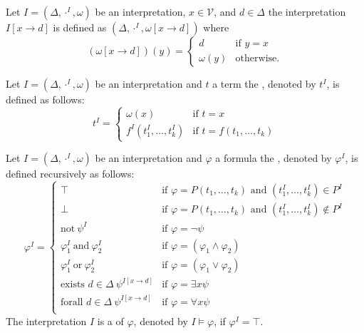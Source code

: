 Let $I=(\Delta,\cdot^I,\omega)$ be an interpretation, $x\in\mathcal{V}$, and $d\in\Delta$ the interpretation $I\left[x\to d\right]$ is defined as $(\Delta,\cdot^I,\omega\left[x\to d\right])$ where
\[(\omega\left[x\to d\right])(y)=
	\begin{cases}
		d         & \text{if $y=x$}   \\
		\omega(y) & \text{otherwise.} 
	\end{cases}\]
\begin{definition}
	Let $I=(\Delta,\cdot^I,\omega)$ be an interpretation and $t$ a term the , denoted by $t^I$, is defined as follows:
	\[t^I=
		\begin{cases}
			\omega(x)              & \text{if $t=x$}                \\
			f^I(t^I_1,\dots,t^I_k) & \text{if $t=f(t_1,\dots,t_k)$} 
		\end{cases}\]
\end{definition}
\begin{definition}
	Let $I=(\Delta,\cdot^I,\omega)$ be an interpretation and $\varphi$ a formula the , denoted by $\varphi^I$, is defined recursively as follows:
	\[\varphi^I=
		\begin{cases}
			\top                                                   & \text{if $\varphi=P(t_1,\dots,t_k)$ and $(t^I_1,\dots,t^I_k)\in P^I$}    \\
			\bot                                                   & \text{if $\varphi=P(t_1,\dots,t_k)$ and $(t^I_1,\dots,t^I_k)\notin P^I$} \\
			\text{not}~\psi^I                                      & \text{if $\varphi=\neg\psi$}                                             \\
			\varphi^I_1~\text{and}~\varphi^I_2                     & \text{if $\varphi=(\varphi_1\wedge\varphi_2)$}                           \\
			\varphi^I_1~\text{or}~\varphi^I_2                      & \text{if $\varphi=(\varphi_1\vee\varphi_2)$}                             \\
			\text{exists $d\in\Delta$}~\psi^{I\left[x\to d\right]} & \text{if $\varphi=\exists x\psi$}                                        \\
			\text{forall $d\in\Delta$}~\psi^{I\left[x\to d\right]} & \text{if $\varphi=\forall x\psi$}                                        \\
		\end{cases}\]
	The interpretation $I$ is a  of $\varphi$, denoted by $I\models\varphi$, if $\varphi^I=\top$.
\end{definition}
